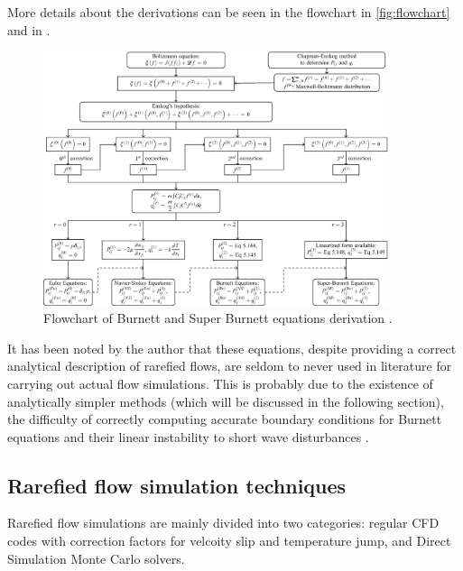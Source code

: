 More details about the derivations can be seen in the flowchart in \autoref{fig:flowchart} and in \cite{burnett}.

\begin{figure}[ht]
    \centering
    \includegraphics[width=0.9\textwidth]{../Images/2. Background/burnettflowchart.png}
    \caption{Flowchart of Burnett and Super Burnett equations derivation \cite{burnett}.}
    \label{fig:flowchart}
\end{figure}

It has been noted by the author that these equations, despite providing a correct analytical description of rarefied flows, are seldom to never used in literature for carrying out actual flow simulations. This is probably due to the existence of analytically simpler methods (which will be discussed in the following section), the difficulty of correctly computing accurate boundary conditions for Burnett equations and their linear instability to short wave disturbances \cite{comprarefied}.

\subsection{Rarefied flow simulation techniques}
Rarefied flow simulations are mainly divided into two categories: regular CFD codes with correction factors for velcoity slip and temperature jump, and Direct Simulation Monte Carlo solvers.



